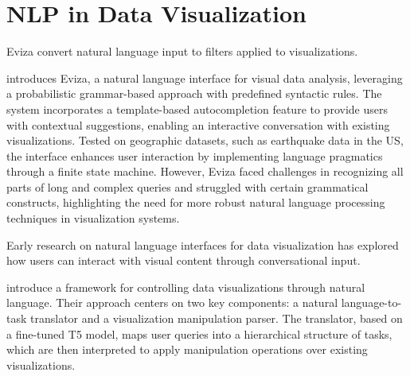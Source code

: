 \section{NLP in Data Visualization}

Eviza \cite{Setlur2016Eviza} convert natural language input to filters applied to visualizations. 

\cite{Setlur2016Eviza} introduces Eviza, a natural language interface for visual data analysis, leveraging a probabilistic grammar-based approach with predefined syntactic rules. The system incorporates a template-based autocompletion feature to provide users with contextual suggestions, enabling an interactive conversation with existing visualizations. Tested on geographic datasets, such as earthquake data in the US, the interface enhances user interaction by implementing language pragmatics through a finite state machine. However, Eviza faced challenges in recognizing all parts of long and complex queries and struggled with certain grammatical constructs, highlighting the need for more robust natural language processing techniques in visualization systems.


\cite{Wu2024LLMVis}


Early research on natural language interfaces for data visualization has explored how users can interact with visual content through conversational input.

\cite{Liu2024NLDriven} introduce a framework for controlling data visualizations through natural language. Their approach centers on two key components: a natural language-to-task translator and a visualization manipulation parser. The translator, based on a fine-tuned T5 model, maps user queries into a hierarchical structure of tasks, which are then interpreted to apply manipulation operations over existing visualizations.


\cite{Luo2022NL2Vis}

\cite{Narechania2021NL4DV}

\cite{Liu2021ADVISor}





